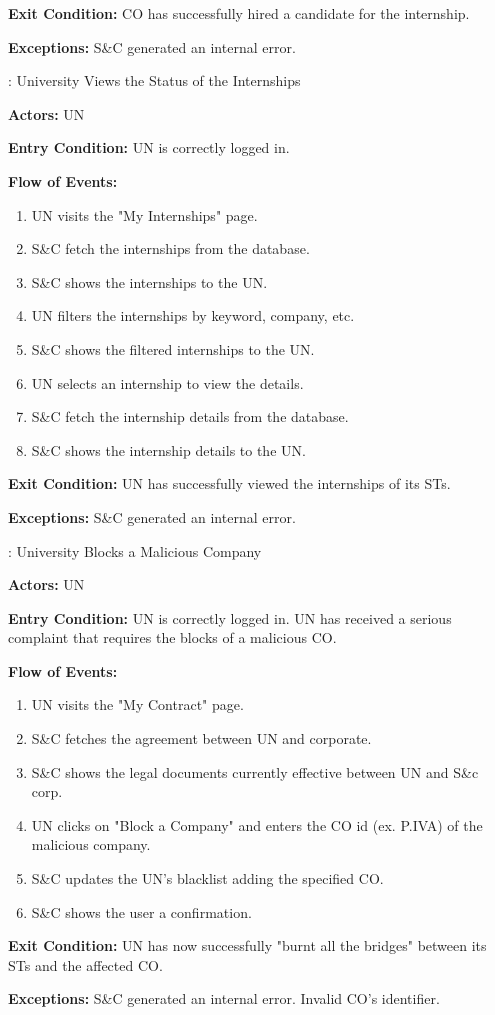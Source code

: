 \par \textbf{Exit Condition:} CO has successfully hired a candidate for the internship.

\par \textbf{Exceptions:}  S\&C generated an internal error.

\nextUseCaseID: University Views the Status of the Internships

\par \textbf{Actors:} UN

\par \textbf{Entry Condition:} UN is correctly logged in.

\par \textbf{Flow of Events:}

\begin{enumerate}
    \item UN visits the "My Internships" page.
    \item S\&C fetch the internships from the database.
    \item S\&C shows the internships to the UN.
    \item UN filters the internships by keyword, company, etc.
    \item S\&C shows the filtered internships to the UN.
    \item UN selects an internship to view the details.
    \item S\&C fetch the internship details from the database.
    \item S\&C shows the internship details to the UN.
\end{enumerate}

\par \textbf{Exit Condition:} UN has successfully viewed the internships of its STs.

\par \textbf{Exceptions:}  S\&C generated an internal error.

\nextUseCaseID: University Blocks a Malicious Company

\par \textbf{Actors:} UN

\par \textbf{Entry Condition:} UN is correctly logged in. UN has received a serious complaint that requires the blocks of a malicious CO.

\par \textbf{Flow of Events:}

\begin{enumerate}
    \item UN visits the "My Contract" page.
    \item S\&C fetches the agreement between UN and corporate.
    \item S\&C shows the legal documents currently effective between UN and S\&c corp.
    \item UN clicks on "Block a Company" and enters the CO id (ex. P.IVA) of the malicious company.
    \item S\&C updates the UN's blacklist adding the specified CO.
    \item S\&C shows the user a confirmation.
\end{enumerate}

\par \textbf{Exit Condition:} UN has now successfully "burnt all the bridges" between its STs and the affected CO.

\par \textbf{Exceptions:}  S\&C generated an internal error. Invalid CO's identifier.
